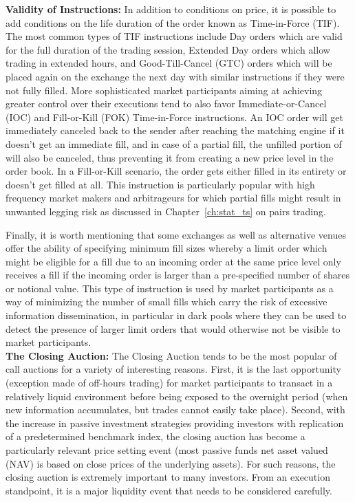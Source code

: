 \noindent\textbf{Validity of Instructions:} In addition to conditions on price, it is possible to add conditions on the life duration of the order known as Time-in-Force (TIF). The most common types of TIF instructions include Day orders which are valid for the full duration of the trading session, Extended Day orders which allow trading in extended hours, and Good-Till-Cancel (GTC) orders which will be placed again on the exchange the next day with similar instructions if they were not fully filled. More sophisticated market participants aiming at achieving greater control over their executions tend to also favor Immediate-or-Cancel (IOC) and Fill-or-Kill (FOK) Time-in-Force instructions. An IOC order will get immediately canceled back to the sender after reaching the matching engine if it doesn't get an immediate fill, and in case of a partial fill, the unfilled portion of will also be canceled, thus preventing it from creating a new price level in the order book. In a Fill-or-Kill scenario, the order gets either filled in its entirety or doesn't get filled at all. This instruction is particularly popular with high frequency market makers and arbitrageurs for which partial fills might result in unwanted legging risk as discussed in Chapter~\ref{ch:stat_ts} on pairs trading.


Finally, it is worth mentioning that some exchanges as well as alternative venues offer the ability of specifying minimum fill sizes whereby a limit order which might be eligible for a fill due to an incoming order at the same price level only receives a fill if the incoming order is larger than a pre-specified number of shares or notional value. This type of instruction is used by market participants as a way of minimizing the number of small fills which carry the risk of excessive information dissemination, in particular in dark pools where they can be used to detect the presence of larger limit orders that would otherwise not be visible to market participants.  \\


\noindent\textbf{The Closing Auction:} The Closing Auction tends to be the most popular of call auctions for a variety of interesting reasons. First, it is the last opportunity (exception made of off-hours trading) for market participants to transact in a relatively liquid environment before being exposed to the overnight period (when new information accumulates, but trades cannot easily take place). Second, with the increase in passive investment strategies providing investors with replication of a predetermined benchmark index, the closing auction has become a particularly relevant price setting event (most passive funds net asset valued (NAV) is based on close prices of the underlying assets). For such reasons, the closing auction is extremely important to many investors. From an execution standpoint, it is a major liquidity event that needs to be considered carefully.


